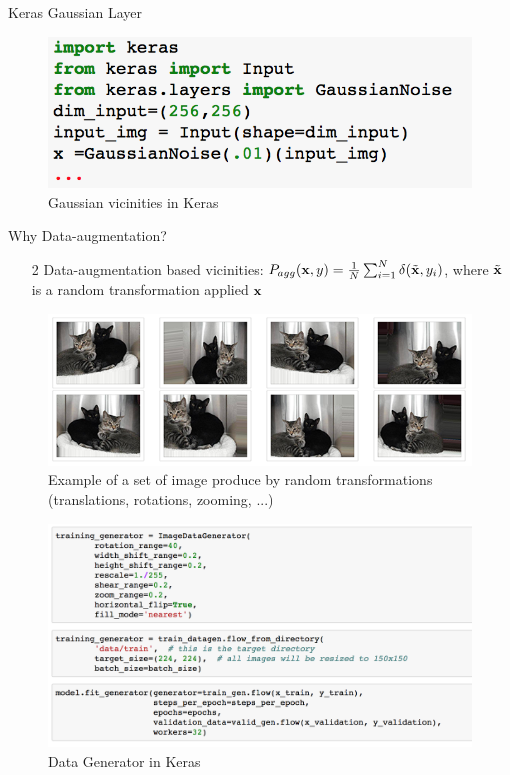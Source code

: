 \documentclass[xcolor=pdftex,dvipsnames,table,mathserif]{beamer}
\begin{document}
\begin{frame}{Keras Gaussian Layer}
\begin{figure}
\includegraphics[width=.95 \columnwidth]{../graphics/GaussianNoiseLayer}
\caption{Gaussian vicinities in Keras}
\end{figure}
\end{frame}

\begin{frame}{Why Data-augmentation?}
\begin{enumerate}
\item[2]  Data-augmentation based vicinities: $P_{agg}(\mathbf{x},y) = \frac{1}{N}\sum_{i=1}^{N}\delta(\tilde{\mathbf{x}},y_i)$, where $\tilde{\mathbf{x}}$ is a random transformation applied $\mathbf{x}$
\end{enumerate}
\begin{figure}
\includegraphics[width=.99 \columnwidth]{../graphics/cat_data_augmentation}
\caption{Example of a set of image produce by random transformations (translations, rotations, zooming, ...)}
\end{figure}
\end{frame}

\begin{frame}
\begin{figure}
\includegraphics[width=.99 \columnwidth]{../graphics/DataGeneratorKeras}
\caption{Data Generator in Keras}
\end{figure}
\end{frame}
\end{document}

